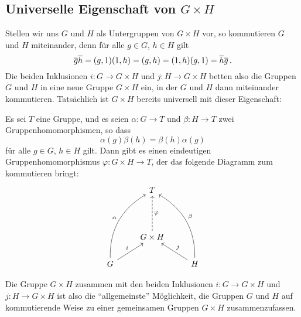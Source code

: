 \subsection*{Universelle Eigenschaft von \texorpdfstring{$G \times H$}{G x H}}

Stellen wir uns $G$ und $H$ als Untergruppen von $G \times H$ vor, so kommutieren $G$ und $H$ miteinander, denn für alle $g \in G$, $h \in H$ gilt
\[
    \overline{g} \overline{h}
  = (g, 1) (1, h)
  = (g, h)
  = (1, h) (g, 1)
  = \overline{h} \overline{g} \,.
\]
Die beiden Inklusionen $i \colon G \to G \times H$ und $j \colon H \to G \times H$ betten also die Gruppen $G$ und $H$ in eine neue Gruppe $G \times H$ ein, in der $G$ und $H$ dann miteinander kommutieren.
Tatsächlich ist $G \times H$ bereits universell mit dieser Eigenschaft:

\begin{proposition}
  Es sei $T$ eine Gruppe, und es seien $\alpha \colon G \to T$ und $\beta \colon H \to T$ zwei Gruppenhomomorphismen, so dass
  \[
      \alpha(g) \beta(h)
    = \beta(h) \alpha(g)
  \]
  für alle $g \in G$, $h \in H$ gilt.
  Dann gibt es einen eindeutigen Gruppenhomomorphismus $\varphi \colon G \times H \to T$, der das folgende Diagramm zum kommutieren bringt:
  \[
    \begin{tikzcd}
        {}
      & T
      & {}
      \\
        {}
      & {}
      & {}
      \\
        {}
      & G \times H
        \arrow[dashed]{uu}[right]{\varphi}
      & {}
      \\
        G
        \arrow{ur}[above left]{i}
        \arrow[bend left]{uuur}[above left]{\alpha}
      & {}
      & H
        \arrow{ul}[above right]{j}
        \arrow[bend right]{uuul}[above right]{\beta}
    \end{tikzcd}
  \]
\end{proposition}

Die Gruppe $G \times H$ zusammen mit den beiden Inklusionen $i \colon G \to G \times H$ und $j \colon H \to G \times H$ ist also die \enquote{allgemeinste} Möglichkeit, die Gruppen $G$ und $H$ auf kommutierende Weise zu einer gemeinsamen Gruppen $G \times H$ zusammenzufassen.
